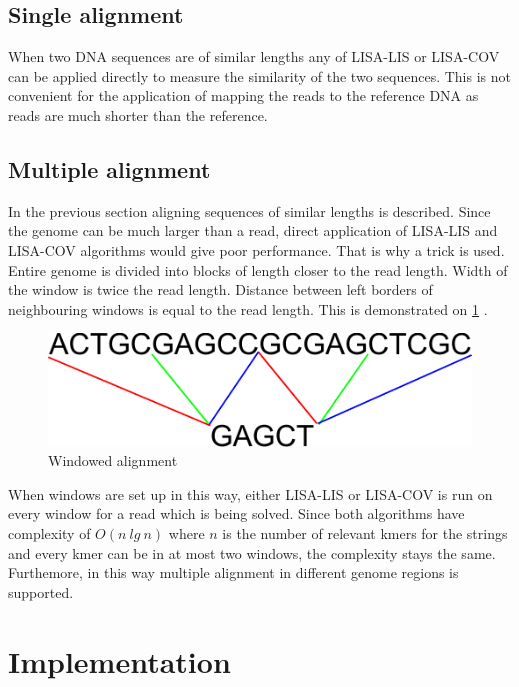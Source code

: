 \documentclass[times, utf8, diplomski]{fer}
\begin{document}
\subsection{Single alignment}

When two DNA sequences are of similar lengths any of LISA-LIS or LISA-COV can be applied directly to measure the similarity of the two sequences. This is not convenient for the application of mapping the reads to the reference DNA as reads are much shorter than the reference.

\subsection{Multiple alignment}
In the previous section aligning sequences of similar lengths is described. Since the genome can be much larger than a read, direct application of LISA-LIS and LISA-COV algorithms would give poor performance. That is why a trick is used. Entire genome is divided into blocks of length closer to the read length. Width of the window is twice the read length. Distance between left borders of neighbouring windows is equal to the read length. This is demonstrated on \ref{windowed.alignment}	.\\

\begin{figure}[H]
\centering
\includegraphics[width=1.0\textwidth]{../img/windowed-alignment.pdf}
\caption{Windowed alignment}\label{windowed.alignment}
\end{figure}

When windows are set up in this way, either LISA-LIS or LISA-COV is run on every window for a read which is being solved. Since both algorithms have complexity of $O(n\ lg\ n)$ where $n$ is the number of relevant kmers for the strings and every kmer can be in at most two windows, the complexity stays the same. Furthemore, in this way multiple alignment in different genome regions is supported.

\section{Implementation}
\end{document}
